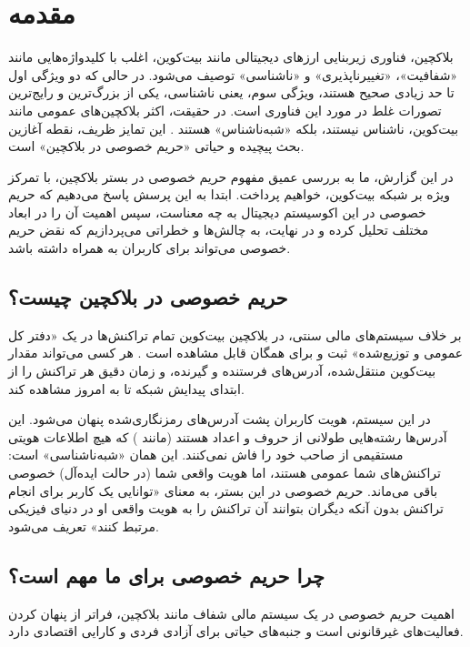 \chapter{مقدمه}
\label{chap:introduction}

بلاکچین، فناوری زیربنایی ارزهای دیجیتالی مانند بیت‌کوین، اغلب با کلیدواژه‌هایی مانند «شفافیت»، «تغییرناپذیری» و «ناشناسی» توصیف می‌شود. در حالی که دو ویژگی اول تا حد زیادی صحیح هستند، ویژگی سوم، یعنی ناشناسی، یکی از بزرگ‌ترین و رایج‌ترین تصورات غلط در مورد این فناوری است. در حقیقت، اکثر بلاکچین‌های عمومی مانند بیت‌کوین، ناشناس نیستند، بلکه «شبه‌ناشناس» هستند \cite{antonopoulos_mastering}. این تمایز ظریف، نقطه آغازین بحث پیچیده و حیاتی «حریم خصوصی در بلاکچین» است.

در این گزارش، ما به بررسی عمیق مفهوم حریم خصوصی در بستر بلاکچین، با تمرکز ویژه بر شبکه بیت‌کوین، خواهیم پرداخت. ابتدا به این پرسش پاسخ می‌دهیم که حریم خصوصی در این اکوسیستم دیجیتال به چه معناست، سپس اهمیت آن را در ابعاد مختلف تحلیل کرده و در نهایت، به چالش‌ها و خطراتی می‌پردازیم که نقض حریم خصوصی می‌تواند برای کاربران به همراه داشته باشد.

\section{حریم خصوصی در بلاکچین چیست؟}

بر خلاف سیستم‌های مالی سنتی، در بلاکچین بیت‌کوین تمام تراکنش‌ها در یک «دفتر کل عمومی و توزیع‌شده» ثبت و برای همگان قابل مشاهده است \cite{nakamoto_whitepaper}. هر کسی می‌تواند مقدار بیت‌کوین منتقل‌شده، آدرس‌های فرستنده و گیرنده، و زمان دقیق هر تراکنش را از ابتدای پیدایش شبکه تا به امروز مشاهده کند.

در این سیستم، هویت کاربران پشت آدرس‌های رمزنگاری‌شده پنهان می‌شود. این آدرس‌ها رشته‌هایی طولانی از حروف و اعداد هستند (مانند ) که هیچ اطلاعات هویتی مستقیمی از صاحب خود را فاش نمی‌کنند. این همان «شبه‌ناشناسی» است: تراکنش‌های شما عمومی هستند، اما هویت واقعی شما (در حالت ایده‌آل) خصوصی باقی می‌ماند. حریم خصوصی در این بستر، به معنای «توانایی یک کاربر برای انجام تراکنش بدون آنکه دیگران بتوانند آن تراکنش را به هویت واقعی او در دنیای فیزیکی مرتبط کنند» تعریف می‌شود.

\section{چرا حریم خصوصی برای ما مهم است؟}

اهمیت حریم خصوصی در یک سیستم مالی شفاف مانند بلاکچین، فراتر از پنهان کردن فعالیت‌های غیرقانونی است و جنبه‌های حیاتی برای آزادی فردی و کارایی اقتصادی دارد.

